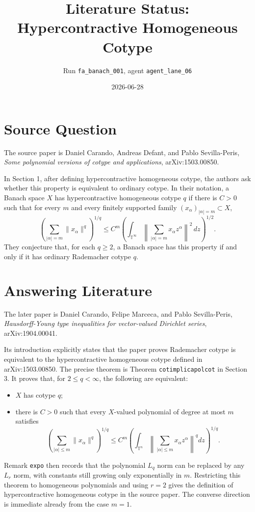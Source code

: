 \documentclass[11pt]{article}
\title{Literature Status: Hypercontractive Homogeneous Cotype}
\author{Run \texttt{fa\_banach\_001}, agent \texttt{agent\_lane\_06}}
\date{2026-06-28}
\newcommand{\T}{\mathbb T}
\begin{document}
\maketitle

\section*{Source Question}

The source paper is Daniel Carando, Andreas Defant, and Pablo Sevilla-Peris,
\emph{Some polynomial versions of cotype and applications},
arXiv:1503.00850.

In Section 1, after defining hypercontractive homogeneous cotype, the authors ask whether this property is equivalent to ordinary cotype. In their notation, a Banach space $X$ has hypercontractive homogeneous cotype $q$ if there is $C>0$ such that for every $m$ and every finitely supported family $(x_\alpha)_{|\alpha|=m}\subset X$,
\[
\left(\sum_{|\alpha|=m}\|x_\alpha\|^q\right)^{1/q}
\le C^m
\left(
\int_{\T^\infty}
\left\|
\sum_{|\alpha|=m} x_\alpha z^\alpha
\right\|^2\,dz
\right)^{1/2}.
\]
They conjecture that, for each $q\ge 2$, a Banach space has this property if and only if it has ordinary Rademacher cotype $q$.

\section*{Answering Literature}

The later paper is Daniel Carando, Felipe Marceca, and Pablo Sevilla-Peris,
\emph{Hausdorff-Young type inequalities for vector-valued Dirichlet series},
arXiv:1904.00041.

Its introduction explicitly states that the paper proves Rademacher cotype is equivalent to the hypercontractive homogeneous cotype defined in arXiv:1503.00850. The precise theorem is Theorem \texttt{cotimplicapolcot} in Section 3. It proves that, for $2\le q<\infty$, the following are equivalent:
\begin{itemize}
\item $X$ has cotype $q$;
\item there is $C>0$ such that every $X$-valued polynomial of degree at most $m$ satisfies
\[
\left(\sum_{|\alpha|\le m}\|x_\alpha\|^q\right)^{1/q}
\le C^m
\left(
\int_{\T^n}
\left\|
\sum_{|\alpha|\le m}x_\alpha z^\alpha
\right\|^q dz
\right)^{1/q}.
\]
\end{itemize}
Remark \texttt{expo} then records that the polynomial $L_q$ norm can be replaced by any $L_r$ norm, with constants still growing only exponentially in $m$. Restricting this theorem to homogeneous polynomials and using $r=2$ gives the definition of hypercontractive homogeneous cotype in the source paper. The converse direction is immediate already from the case $m=1$.
\end{document}
